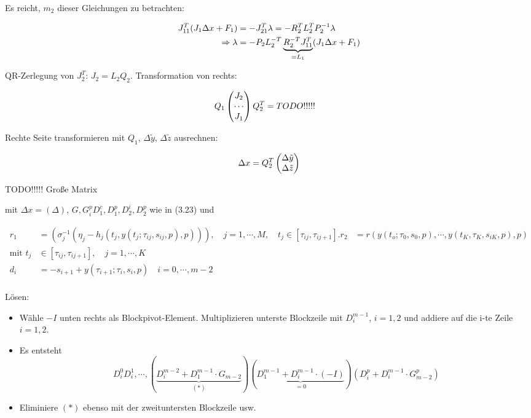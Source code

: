 Es reicht, $m_2$ dieser Gleichungen zu betrachten:

\begin{align*}
J_{11}^T (J_1 \Delta x + F_1) &= - J_{21}^T \lambda = - R_2^T L_2^T P_2^{-1} \lambda \\
\Rightarrow \lambda &= - P_2 L_2^{-T} \underbrace{R_2^{-T} J_{11}^T}_{=L_1} (J_1 \Delta x + F_1)
\end{align*}


QR-Zerlegung von $J_2^T$: $J_2 = L_2 Q_2$. Transformation von rechts:

\begin{align*}
Q_1 \begin{pmatrix} J_2 \\ \cdots \\ J_1 \end{pmatrix} Q_2^T &= TODO!!!!!
\end{align*}

Rechte Seite transformieren mit $Q_1$, $\Delta \tilde y$, $\Delta \tilde z$ ausrechnen:

\[ \Delta x = Q_2^T \begin{pmatrix} \Delta \tilde y \\ \Delta \tilde z \end{pmatrix} \]


TODO!!!!! Große Matrix

mit $\Delta x = (\Delta )$, $G, G_i^p D_1^{\dot c}, D_1^p, D_2^i, D_2^p$ wie in (3.23) und 

\begin{align*}
r_1 &= (\sigma_j^{-1} (\eta_j -h_j(t_j, y(t_j; \tau_{ij}, s_{ij}, p), p))), \quad j=1,\cdots,M, \quad t_j \in [\tau_{ij}, \tau_{ij+1}].
r_2 &= r(y(t_o; \tau_0, s_0, p), \cdots, y(t_K, \tau_K, s_{iK}, p), p) \\
\text{mit } t_{j} &\in [\tau_{ij}, \tau_{ij+1}], \quad j= 1,\cdots,K \\
d_i &= - s_{i+1} + y(\tau_{i+1}; \tau_i, s_i, p) \quad i = 0,\cdots, m-2 \\
\end{align*}

Lösen:

\begin{itemize}
\item Wähle $-I$ unten rechts als Blockpivot-Element. Multiplizieren unterste Blockzeile mit $D_i^{m-1}$, $i=1,2$ und addiere auf die i-te Zeile $i=1,2$.
\item Es entsteht \[ D_i^0 D_i^1, \cdots, (\underbrace{D_i^{m-2} + D_1^{m-1} \cdot G_{m-2}}_{(*)}) (\underbrace{ D_1^{m-1} + D_i^{m-1} \cdot (-I)}_{=0})(D_i^p + D_i^{m-1} \cdot G_{m-2}^p) \]
\item Eliminiere $(*)$ ebenso mit der zweituntersten Blockzeile usw.
\end{itemize}

